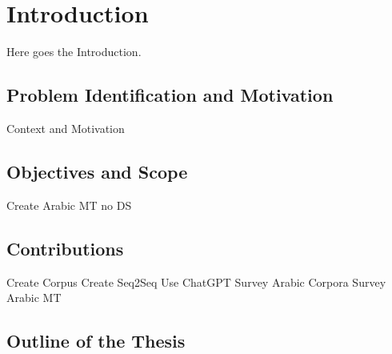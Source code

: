 \chapter{Introduction}
\pagestyle{fancy}
\pagestyle{fancy}\chead{} \pagestyle{fancy}\rhead{}
\pagestyle{fancy}
\pagestyle{fancy}\cfoot{} \pagestyle{fancy}\rfoot{\thepage}
Here goes the Introduction.\\
\section{Problem Identification and Motivation}\label{start1}
Context and Motivation
\section{Objectives and Scope}
Create Arabic MT
no DS

\section{Contributions}
Create Corpus
Create Seq2Seq
Use ChatGPT
Survey Arabic Corpora
Survey Arabic MT
\section{Outline of the Thesis}
